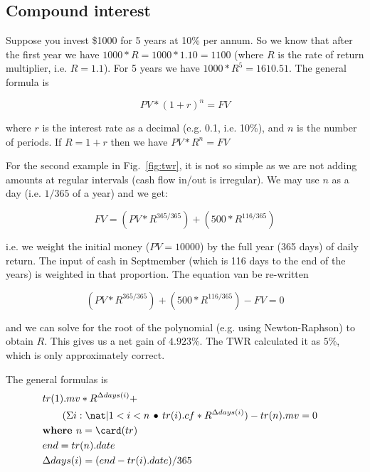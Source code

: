 \documentclass[runningheads,12pt]{article}
\begin{document}
\subsection{Compound interest}
Suppose you invest \$1000 for 5 years at 10\% per annum. So we know that after the first year we have $1000*R = 1000*1.10 = 1100$ (where $R$ is the rate of return multiplier, i.e. $R=1.1$). For 5 years we have $1000*R^5 = 1610.51$. The general formula is

\[ PV * (1+r)^n = FV\]

\noindent where $r$ is the interest rate as a decimal (e.g. 0.1, i.e. 10\%), and $n$ is the number of periods. If $R=1+r$ then we have $PV * R^n = FV$


For the second example in Fig.~\ref{fig:twr}, it is not so simple as we are not adding amounts at regular intervals (cash flow in/out is irregular). We may use $n$ as a day (i.e. $1/365$ of a year) and we get:

\[
FV = (PV *R^{365/365}) + (500*R^{116/365})
\]

i.e. we weight the initial money ($PV = 10000$) by the full year (365 days) of daily return. The input of cash in Septmember (which is 116 days to the end of the years) is weighted in that proportion. The equation van be re-written

\[
(PV *R^{365/365}) + (500*R^{116/365}) -FV = 0
\]

and we can solve for the root of the polynomial (e.g. using Newton-Raphson) to obtain $R$. This gives us a net gain of $4.923$\%. The TWR calculated it as $5$\%, which is only approximately correct.

The general formulas is
\begin{align}
\small
& tr(1).mv * R^{\Delta days(i)} + \\\nonumber
& \qquad (\Sigma i: \nat|1 < i < n\itholds tr(i).cf * R^{\Delta days(i)})- tr(n).mv = 0\\
& \textbf{where } n = \card(tr)& \nonumber \\
& end = tr(n).date&\\\nonumber
&\Delta days(i) = (end- tr(i).date)/365&\nonumber
\end{align}
\end{document}
